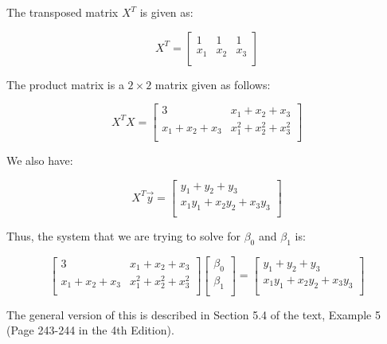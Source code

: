 \documentclass[10pt]{amsart}
\begin{document}
The transposed matrix $X^T$ is given as:

$$X^T = \left[\begin{matrix} 1 & 1 & 1 \\ x_1 & x_2 & x_3 \\\end{matrix}\right]$$

The product matrix is a $2 \times 2$ matrix given as follows:

$$X^TX = \left[\begin{matrix} 3 & x_1 + x_2 + x_3 \\ x_1 + x_2 + x_3 & x_1^2 + x_2^2 + x_3^2 \\\end{matrix}\right]$$

We also have:

$$X^T\vec{y} = \left[\begin{matrix} y_1 + y_2 + y_3 \\ x_1y_1 + x_2y_2 + x_3y_3 \\\end{matrix}\right]$$

Thus, the system that we are trying to solve for $\beta_0$ and $\beta_1$ is:

$$\left[\begin{matrix} 3 & x_1 + x_2 + x_3 \\ x_1 + x_2 + x_3 & x_1^2 + x_2^2 + x_3^2 \\\end{matrix}\right]\left[\begin{matrix} \beta_0 \\ \beta_1 \\\end{matrix}\right] = \left[\begin{matrix} y_1 + y_2 + y_3 \\ x_1y_1 + x_2y_2 + x_3y_3 \\\end{matrix}\right]$$

The general version of this is described in Section 5.4 of the text,
Example 5 (Page 243-244 in the 4th Edition).
\end{document}
